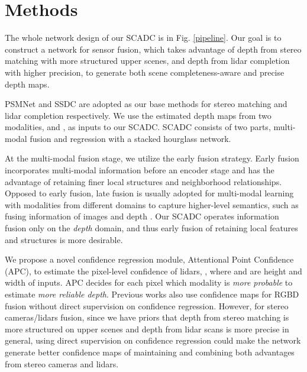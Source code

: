 \documentclass{article}
\begin{document}
\section{Methods}
\label{sec:methods}

The whole network design of our SCADC is in Fig. \ref{pipeline}. Our goal is to construct a network for sensor fusion, which takes advantage of depth from stereo matching with more structured upper scenes, and depth from lidar completion with higher precision, to generate both scene completeness-aware and precise depth maps.

PSMNet \cite{chang2018pyramid} and SSDC \cite{ma2019self} are adopted as our base methods for stereo matching and lidar completion respectively. We use the estimated depth maps from two modalities,  and , as inputs to our SCADC. SCADC consists of two parts, multi-modal fusion and regression with a stacked hourglass network.

At the multi-modal fusion stage, we utilize the early fusion strategy. Early fusion incorporates multi-modal information before an encoder stage and has the advantage of retaining finer local structures and neighborhood relationships. Opposed to early fusion, late fusion is usually adopted for multi-modal learning with modalities from different domains to capture higher-level semantics, such as fusing information of images and depth \cite{zhong2019deep, Jaritz_2018}. Our SCADC operates information fusion only on the \textit{depth} domain, and thus early fusion of retaining local features and structures is more desirable.

We propose a novel confidence regression module, Attentional Point Confidence (APC), to estimate the pixel-level confidence of lidars, , where  and  are height and width of inputs. APC decides for each pixel which modality is \textit{more probable} to estimate \textit{more reliable depth}. Previous works \cite{qiu2018deeplidar, van2019sparse} also use confidence maps for RGBD fusion without direct supervision on confidence regression. However, for stereo cameras/lidars fusion, since we have priors that depth from stereo matching is more structured on upper scenes and depth from lidar scans is more precise in general, using direct supervision on confidence regression could make the network generate better confidence maps of maintaining and combining both advantages from stereo cameras and lidars.
\end{document}
